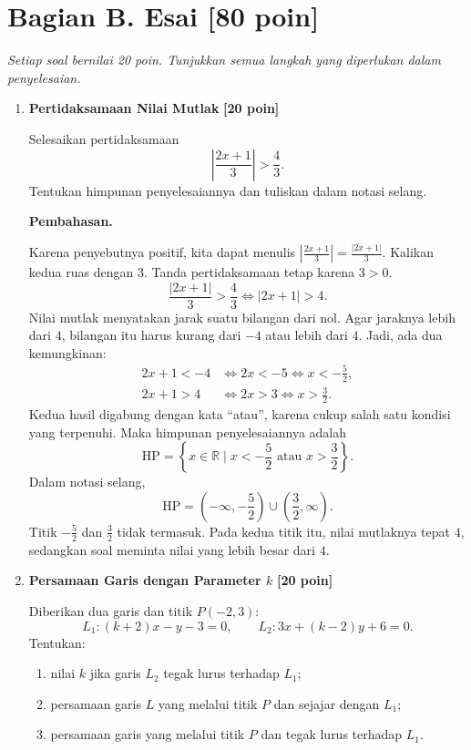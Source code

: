 \documentclass[12pt,a4paper]{article}
\newcommand{\pembahasan}{\par\medskip\textbf{Pembahasan.}\par\smallskip}
\newcommand{\poin}[1]{\hfill\textbf{[#1 poin]}}
\begin{document}
\newpage
\section*{Bagian B. Esai \hfill [80 poin]}
\textit{Setiap soal bernilai 20 poin. Tunjukkan semua langkah yang diperlukan dalam penyelesaian.}

\begin{enumerate}
  \item \textbf{Pertidaksamaan Nilai Mutlak} \poin{20}

    Selesaikan pertidaksamaan
    \[
      \left|\frac{2x+1}{3}\right|>\frac43.
    \]
    Tentukan himpunan penyelesaiannya dan tuliskan dalam notasi selang.

    \pembahasan
    Karena penyebutnya positif, kita dapat menulis
    $\left|\frac{2x+1}{3}\right|=\frac{|2x+1|}{3}$.
    Kalikan kedua ruas dengan $3$. Tanda pertidaksamaan tetap karena $3>0$.
    \[
      \frac{|2x+1|}{3}>\frac43\iff |2x+1|>4.
    \]
    Nilai mutlak menyatakan jarak suatu bilangan dari nol.
    Agar jaraknya lebih dari $4$, bilangan itu harus kurang dari $-4$ atau lebih dari $4$.
    Jadi, ada dua kemungkinan:
    \begin{align*}
      2x+1<-4 &\iff 2x<-5\iff x<-\frac52,\\
      2x+1>4 &\iff 2x>3\iff x>\frac32.
    \end{align*}
    Kedua hasil digabung dengan kata ``atau'', karena cukup salah satu kondisi yang terpenuhi.
    Maka himpunan penyelesaiannya adalah
    \[
      \boxed{\mathrm{HP}=\left\{x\in\mathbb{R}\mid x<-\frac52
        \text{ atau }x>\frac32\right\}}.
    \]
    Dalam notasi selang,
    \[
      \boxed{\mathrm{HP}=\left(-\infty,-\frac52\right)
        \cup\left(\frac32,\infty\right)}.
    \]
    Titik $-\frac52$ dan $\frac32$ tidak termasuk.
    Pada kedua titik itu, nilai mutlaknya tepat $4$, sedangkan soal meminta nilai yang lebih besar dari $4$.

  \newpage
  \item \textbf{Persamaan Garis dengan Parameter $k$} \poin{20}

    Diberikan dua garis dan titik $P(-2,3)$:
    \[
      L_1:(k+2)x-y-3=0,\qquad
      L_2:3x+(k-2)y+6=0.
    \]
    Tentukan:
    \begin{enumerate}
      \item nilai $k$ jika garis $L_2$ tegak lurus terhadap $L_1$;
      \item persamaan garis $L$ yang melalui titik $P$ dan sejajar dengan $L_1$;
      \item persamaan garis yang melalui titik $P$ dan tegak lurus terhadap $L_1$.
    \end{enumerate}


\end{enumerate}
\end{document}
